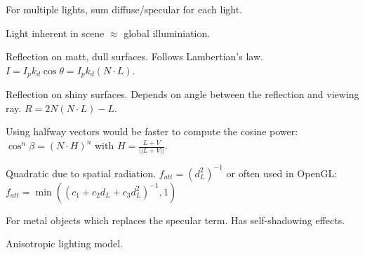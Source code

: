 \begin{theorem}
  For multiple lights, sum diffuse/specular for each light.
\end{theorem}

\begin{definition}[Ambient]
  Light inherent in scene \(\approx\) global illuminiation.
\end{definition}

\begin{definition}[Diffuse]
  Reflection on matt, dull surfaces. Follows Lambertian's law.
  \(I = I_pk_d\cos \theta = I_p k_d(N \cdot L)\).
\end{definition}

\begin{definition}[Specular]
  Reflection on shiny surfaces. Depends on angle between the reflection and viewing ray. \(R=2N(N \cdot L) - L\).
\end{definition}

\begin{theorem}
  Using halfway vectors would be faster to compute the cosine power: \(\cos^n \beta = (N \cdot H)^n\) with \(H = \frac{L + V}{||L + V||}\).
\end{theorem}

\begin{definition}[Attenuation]
  Quadratic due to spatial radiation. \(f_{att} = (d_L^2)^{-1}\) or often used in OpenGL:
  \(f_{att} = \min((c_1 + c_2d_L + c_3d_L^2)^{-1}, 1)\)
\end{definition}

\begin{definition}
  For metal objects which replaces the specular term. Has self-shadowing effects.
\end{definition}

\begin{definition}[Ashikhmin]
  Anisotropic lighting model.
\end{definition}
